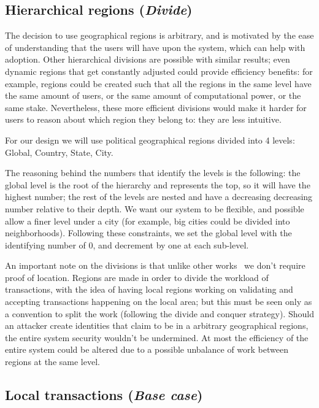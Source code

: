 \subsection{Hierarchical regions (\textit{Divide})}

The decision to use geographical regions is arbitrary, and is motivated by the
ease of understanding that the users will have upon the system, which can help
with adoption.  Other hierarchical divisions are possible with similar results;
even dynamic regions that get constantly adjusted could provide efficiency
benefits: for example, regions could be created such that all the regions in
the same level have the same amount of users, or the same amount of
computational power, or the same stake.  Nevertheless, these more efficient
divisions would make it harder for users to reason about which region they
belong to: they are less intuitive.

For our design we will use political geographical regions divided into 4
levels: Global, Country, State, City.

The reasoning behind the numbers that identify the levels is the following: the
global level is the root of the hierarchy and represents the top, so it will
have the highest number; the rest of the levels are nested and have a
decreasing decreasing number relative to their depth.  We want our system to be
flexible, and possible allow a finer level under a city (for example, big
cities could be divided into neighborhoods).  Following these constraints, we
set the global level with the identifying number of 0, and decrement by one at
each sub-level.

An important note on the divisions is that unlike other
works~\cite{unchain} we don't require proof of location.  Regions are made
in order to divide the workload of transactions, with the idea of having local
regions working on validating and accepting transactions happening on the local
area; but this must be seen only as a convention to split the work (following
the divide and conquer strategy).  Should an attacker create identities that
claim to be in a arbitrary geographical regions, the entire system security
wouldn't be undermined.  At most the efficiency of the entire system could be
altered due to a possible unbalance of work between regions at the same level.

\subsection{Local transactions (\textit{Base case})}

